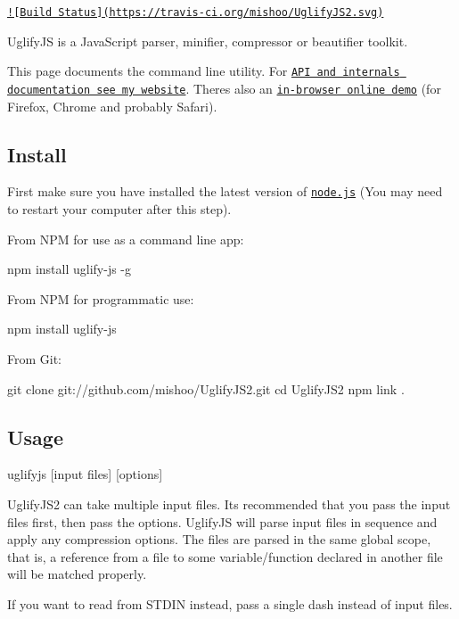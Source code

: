 \href{https://travis-ci.org/mishoo/UglifyJS2}{\tt !\mbox{[}Build Status\mbox{]}(https\+://travis-\/ci.\+org/mishoo/\+Uglify\+J\+S2.\+svg)}

Uglify\+J\+S is a Java\+Script parser, minifier, compressor or beautifier toolkit.

This page documents the command line utility. For \href{http://lisperator.net/uglifyjs/}{\tt A\+P\+I and internals documentation see my website}. There\textquotesingle{}s also an \href{http://lisperator.net/uglifyjs/#demo}{\tt in-\/browser online demo} (for Firefox, Chrome and probably Safari).

\subsection*{Install }

First make sure you have installed the latest version of \href{http://nodejs.org/}{\tt node.\+js} (You may need to restart your computer after this step).

From N\+P\+M for use as a command line app\+: \begin{DoxyVerb}npm install uglify-js -g
\end{DoxyVerb}


From N\+P\+M for programmatic use\+: \begin{DoxyVerb}npm install uglify-js
\end{DoxyVerb}


From Git\+: \begin{DoxyVerb}git clone git://github.com/mishoo/UglifyJS2.git
cd UglifyJS2
npm link .
\end{DoxyVerb}


\subsection*{Usage }

\begin{DoxyVerb}uglifyjs [input files] [options]
\end{DoxyVerb}


Uglify\+J\+S2 can take multiple input files. It\textquotesingle{}s recommended that you pass the input files first, then pass the options. Uglify\+J\+S will parse input files in sequence and apply any compression options. The files are parsed in the same global scope, that is, a reference from a file to some variable/function declared in another file will be matched properly.

If you want to read from S\+T\+D\+I\+N instead, pass a single dash instead of input files.

